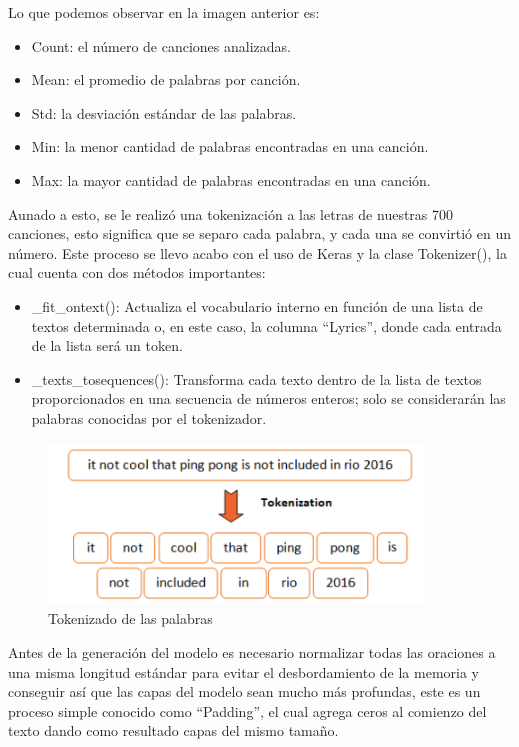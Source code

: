\documentclass[12pt, a4paper, titlepage]{article}
\begin{document}
	Lo que podemos observar en la imagen anterior es:
	\begin{itemize}
		\item Count: el número de canciones analizadas.
		\item Mean: el promedio de palabras por canción.
		\item Std: la desviación estándar de las palabras.
		\item Min: la menor cantidad de palabras encontradas en una canción.
		\item Max: la mayor cantidad de palabras encontradas en una canción.
	\end{itemize}
	Aunado a esto, se le realizó una tokenización a las letras de nuestras 700 canciones, esto significa que se separo cada palabra, y cada una se convirtió en un número. Este proceso se llevo acabo con el uso de Keras y la clase Tokenizer(), la cual cuenta con dos métodos importantes:
	\begin{itemize}
		\item \_fit\_ontext(): Actualiza el vocabulario interno en función de una lista de textos determinada o, en este caso, la columna “Lyrics”, donde cada entrada de la lista será un token.
		\item \_texts\_tosequences(): Transforma cada texto dentro de la lista de textos proporcionados en una secuencia de números enteros; solo se considerarán las palabras conocidas por el tokenizador.
	\end{itemize}	
	\begin{figure}[H]
		\includegraphics[width=10cm]{./Imagenes/Modelo/tokenization.png}
		\centering 
		\caption{Tokenizado de las palabras \cite{tokenimagen}}
	\end{figure}
	Antes de la generación del modelo es necesario normalizar todas las oraciones a una misma longitud estándar para evitar el desbordamiento de la memoria y conseguir así que las capas del modelo sean mucho más profundas, este es un proceso simple conocido como “Padding”, el cual agrega ceros al comienzo del texto dando como resultado capas del mismo tamaño.\\\\
\end{document}
